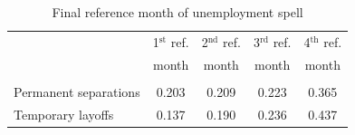 \documentclass[12pt]{article}
\begin{document}
    \begin{table}
      \caption{Final reference month of unemployment spell}
      \begin{center}
  \begin{tabular}{l|cccc}
    & \multicolumn{1}{c}{1$^\text{st}$ ref.}
    & \multicolumn{1}{c}{2$^\text{nd}$ ref.}
    & \multicolumn{1}{c}{3$^\text{rd}$ ref.}
    & \multicolumn{1}{c}{4$^\text{th}$ ref.} \\
    & \multicolumn{1}{c}{month}
    & \multicolumn{1}{c}{month}
    & \multicolumn{1}{c}{month}
    & \multicolumn{1}{c}{month} \\ \hline \\[-1em]
    Permanent separations & 0.203 &  0.209 &  
    0.223 &   0.365 \\[.35em]
    Temporary layoffs     & 0.137 &  0.190 &  
    0.236 &   0.437 \\[.35em]
    \hline
  \end{tabular}
      \end{center}
    \end{table}
\end{document}
